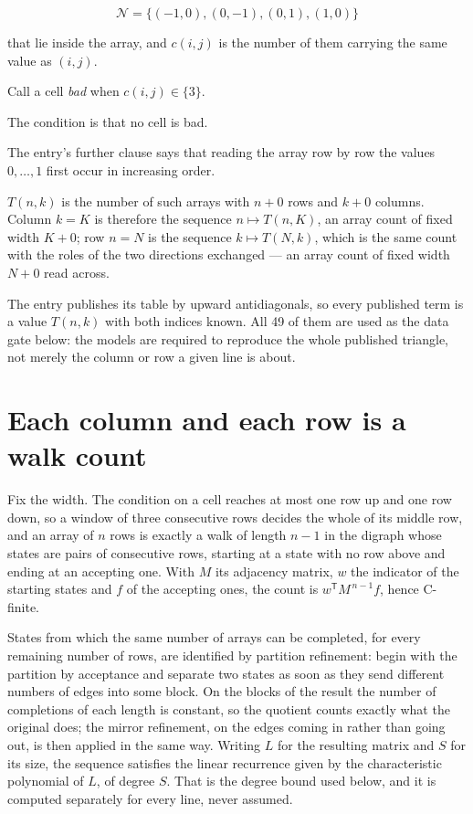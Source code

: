 \documentclass[11pt]{article}
\theoremstyle{definition}
\begin{document}
\[\mathcal{N} = \{(-1,0), (0,-1), (0,1), (1,0)\}\]

that lie inside the array, and $c(i,j)$ is the number of them carrying the same value as $(i,j)$.

Call a cell {\itshape bad} when $c(i,j) \in \{3\}$.

The condition is that no cell is bad.

The entry's further clause says that reading the array row by row the values $0,\dots,1$ first occur in increasing order.

$T(n,k)$ is the number of such arrays with $n + 0$ rows and $k + 0$ columns. Column $k = K$ is therefore the sequence $n \mapsto T(n,K)$, an array count of fixed width $K + 0$; row $n = N$ is the sequence $k \mapsto T(N,k)$, which is the same count with the roles of the two directions exchanged --- an array count of fixed width $N + 0$ read across.

The entry publishes its table by upward antidiagonals, so every published term is a value $T(n,k)$ with both indices known. All 49 of them are used as the data gate below: the models are required to reproduce the whole published triangle, not merely the column or row a given line is about.

\section{Each column and each row is a walk count}

Fix the width. The condition on a cell reaches at most one row up and one row down, so a window of three consecutive rows decides the whole of its middle row, and an array of $n$ rows is exactly a walk of length $n-1$ in the digraph whose states are pairs of consecutive rows, starting at a state with no row above and ending at an accepting one. With $M$ its adjacency matrix, $w$ the indicator of the starting states and $f$ of the accepting ones, the count is $w^{\mathsf T}M^{\,n-1}f$, hence C-finite.

States from which the same number of arrays can be completed, for every remaining number of rows, are identified by partition refinement: begin with the partition by acceptance and separate two states as soon as they send different numbers of edges into some block. On the blocks of the result the number of completions of each length is constant, so the quotient counts exactly what the original does; the mirror refinement, on the edges coming in rather than going out, is then applied in the same way. Writing $L$ for the resulting matrix and $S$ for its size, the sequence satisfies the linear recurrence given by the characteristic polynomial of $L$, of degree $S$. That is the degree bound used below, and it is computed separately for every line, never assumed.
\end{document}
